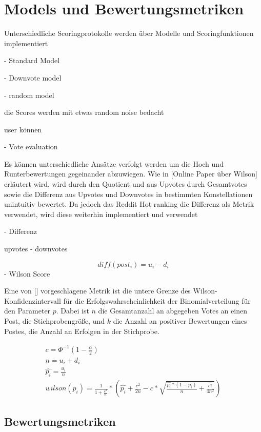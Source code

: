 \chapter{Models und Bewertungsmetriken}

Unterschiedliche Scoringprotokolle werden über Modelle und Scoringfunktionen implementiert

- Standard Model



- Downvote model


- random model 

die Scores werden mit etwas random noise bedacht

user können 


-  Vote evaluation

	Es können unterschiedliche Ansätze verfolgt werden um die Hoch und Runterbewertungen gegeinander abzuwiegen. 
	Wie in [Online Paper über Wilson] erläutert wird, wird durch den Quotient und aus Upvotes durch Gesamtvotes sowie die Differenz aus Upvotes und Downvotes in bestimmten Konstellationen unintuitiv bewertet. Da jedoch das Reddit Hot ranking die Differenz als Metrik verwendet, wird diese weiterhin implementiert und verwendet
	
- Differenz
	
	upvotes - downvotes
	
\begin{equation}
diff(post_{i}) = u_{i} - d_{i}
\end{equation}
- Wilson Score

	Eine von [] vorgeschlagene Metrik ist die untere Grenze des Wilson-Konfidenzintervall für die Erfolgswahrscheinlichkeit der Binomialverteilung für den Parameter $p$. Dabei ist $n$ die Gesamtanzahl an abgegeben Votes an einen Post, die Stichprobengröße, und $k$ die Anzahl an positiver Bewertungen eines Postes, die Anzahl an Erfolgen in der Stichprobe.
	
\begin{align}
 c = \Phi^{-1}(1 - \frac{\alpha}{2}) \\
 n = u_{i} + d_{i} \\
 \hat{p_{i}} = \frac{u_{i}}{n}  \\
 wilson(p_{i}) = \frac{1}{1+\frac{c^2}{n}}*(\hat{p_{i}} + \frac{c^2}{2n} - c* \sqrt{\frac{\hat{p_{i}}*(1 - \hat{p_{i}})}{n} + \frac{c^2}{4n^2}})
\end{align}
	
	

\section{Bewertungsmetriken}

